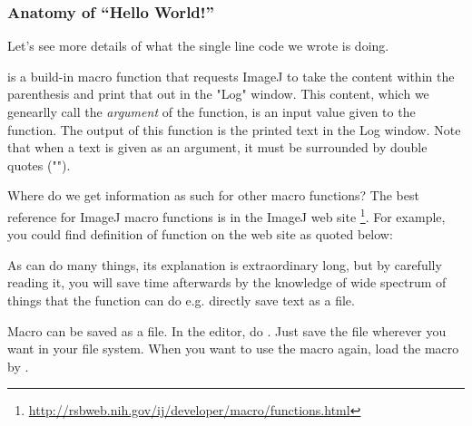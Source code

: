 \subsubsection{Anatomy of ``Hello World!''}

Let's see more details of what the single line code we wrote is doing.

 is a build-in macro function that requests ImageJ to take the content within the parenthesis and print that out in the "Log" window. This content, which we genearlly call the \textit{argument} of the function, is an input value given to the function. The output of this function is the printed text in the Log window. Note that when a text is given as an argument, it must be surrounded by double quotes ("").

Where do we get information as such for other macro functions? The best reference for ImageJ macro functions is in the ImageJ web site
\footnote{\url{http://rsbweb.nih.gov/ij/developer/macro/functions.html}}. 
For example, you could find definition of  function on the web site as quoted below:\\

\begin{indentCom}
\end{indentCom}

As  can do many things, its explanation is extraordinary long, but by carefully reading it, you will save time afterwards by the knowledge of wide spectrum of things that the  function can do e.g. directly save text as a file.

Macro can be saved as a file.
In the editor, do . Just save the file wherever you want in your file system. When you want to use the macro again, load the macro by .

